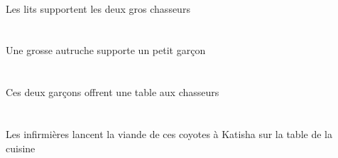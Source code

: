 \begin{exe}
   \DEFPlErgG{}   \litDPlErgG{}   \DEFDuAbsG{}   \grosCDuG{}   \chasseurCDuAbsG{}  \supporterVtPrsCDuG{} \\
 Les lits supportent les deux gros chasseurs
\ex\glll
   \INDSgErg{}   \grosBSg{}   \autrucheBSgErg{}   \INDSgAbs{}   \petitDSg{}   \garconDSgAbs{}  \supporterVtPrsDSg{} \\
   \INDSgErgP{}   \grosBSgP{}   \autrucheBSgErgP{}   \INDSgAbsP{}   \petitDSgP{}   \garconDSgAbsP{}  \supporterVtPrsDSgP{} \\
   \INDSgErgG{}   \grosBSgG{}   \autrucheBSgErgG{}   \INDSgAbsG{}   \petitDSgG{}   \garconDSgAbsG{}  \supporterVtPrsDSgG{} \\
 Une grosse autruche supporte un petit garçon
\ex\glll
   \DEMDuErg{}   \garconDDuErg{}    \DEFPlObl{}   \chasseurCPlObl{}   \A{}   \INDSgAbs{}   \tableDSgAbs{}  \offrirVdPrsDSg{} \\
   \DEMDuErgP{}   \garconDDuErgP{}    \DEFPlOblP{}   \chasseurCPlOblP{}   \AP{}   \INDSgAbsP{}   \tableDSgAbsP{}  \offrirVdPrsDSgP{} \\
   \DEMDuErgG{}   \garconDDuErgG{}    \DEFPlOblG{}   \chasseurCPlOblG{}   \AG{}   \INDSgAbsG{}   \tableDSgAbsG{}  \offrirVdPrsDSgG{} \\
 Ces deux garçons offrent une table aux chasseurs
\ex\glll
    \DEFSgObl{}    \DEFSgObl{}   \cuisineDSgObl{}   \DE{}   \tableDSgObl{}   \SUR{}   \DEFPlErg{}   \infirmiereAPlErg{}    \INDSgDat{}   \KatishaASgDat{}   \DEFSgAbs{}    \DEMPlObl{}   \coyoteCPlObl{}   \DE{}   \viandeASgAbs{}  \lancerVdPrsASg{} \\
    \DEFSgOblP{}    \DEFSgOblP{}   \cuisineDSgOblP{}   \DEP{}   \tableDSgOblP{}   \SURP{}   \DEFPlErgP{}   \infirmiereAPlErgP{}    \INDSgDatP{}   \KatishaASgDatP{}   \DEFSgAbsP{}    \DEMPlOblP{}   \coyoteCPlOblP{}   \DEP{}   \viandeASgAbsP{}  \lancerVdPrsASgP{} \\
    \DEFSgOblG{}    \DEFSgOblG{}   \cuisineDSgOblG{}   \DEG{}   \tableDSgOblG{}   \SURG{}   \DEFPlErgG{}   \infirmiereAPlErgG{}    \INDSgDatG{}   \KatishaASgDatG{}   \DEFSgAbsG{}    \DEMPlOblG{}   \coyoteCPlOblG{}   \DEG{}   \viandeASgAbsG{}  \lancerVdPrsASgG{} \\
 Les infirmières lancent la viande de ces coyotes à Katisha sur la table de la cuisine
\ex\glll
    \DEFPlObl{}   \grosBPl{}   \noirBPl{}   \coussinBPlObl{}   \SUR{}   \DEFPlErg{}   \troisBPl{}   \maigreBPl{}   \autrucheBPlErg{}   \INDPlAbs{}   \blancCPl{}   \oeufCPlAbs{}  \donnerVdPstCPl{} \\
    \DEFPlOblP{}   \grosBPlP{}   \noirBPlP{}   \coussinBPlOblP{}   \SURP{}   \DEFPlErgP{}   \troisBPlP{}   \maigreBPlP{}   \autrucheBPlErgP{}   \INDPlAbsP{}   \blancCPlP{}   \oeufCPlAbsP{}  \donnerVdPstCPlP{} \\

\end{exe}
